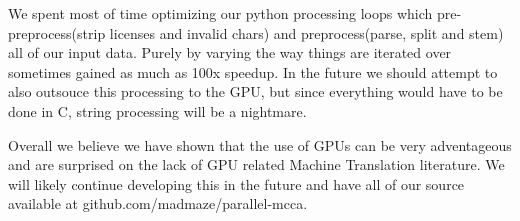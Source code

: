 \documentclass[12pt]{article}
\begin{document}
We spent most of time optimizing our python processing loops which pre-preprocess(strip licenses and invalid chars) and preprocess(parse, split and stem) all of our input data. Purely by varying the way things are iterated over sometimes gained as much as 100x speedup. In the future we should attempt to also outsouce this processing to the GPU, but since everything would have to be done in C, string processing will be a nightmare. 

Overall we believe we have shown that the use of GPUs can be very adventageous and are surprised on the lack of GPU related Machine Translation literature. We will likely continue developing this in the future and have all of our source available at github.com/madmaze/parallel-mcca.



\end{document}
